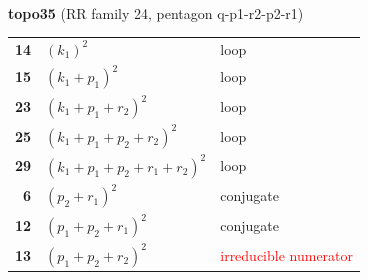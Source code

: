 \documentclass[10pt]{article}
\begin{document}
\begin{minipage}[t]{0.48\textwidth}
{}\\[2mm]\textbf{topo35} (RR family 24, pentagon q-p1-r2-p2-r1)\\[2pt]{\footnotesize\begin{tabular}{@{}r@{\ \ }l@{\ \ }l@{}}\textbf{14} & $(k_1)^2$ & loop\\
\textbf{15} & $(k_1+p_1)^2$ & loop\\
\textbf{23} & $(k_1+p_1+r_2)^2$ & loop\\
\textbf{25} & $(k_1+p_1+p_2+r_2)^2$ & loop\\
\textbf{29} & $(k_1+p_1+p_2+r_1+r_2)^2$ & loop\\
\textbf{6} & $(p_2+r_1)^2$ & conjugate\\
\textbf{12} & $(p_1+p_2+r_1)^2$ & conjugate\\
\textbf{13} & $(p_1+p_2+r_2)^2$ & \textcolor{red}{irreducible numerator}\\\end{tabular}}\end{minipage}\hfill%
\end{document}
